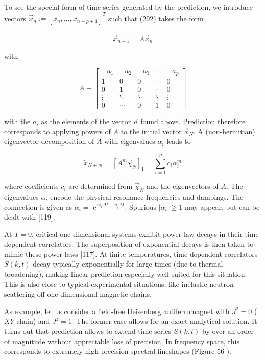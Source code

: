 \documentclass[12pt]{article}
\begin{document}
To see the special form of time-series generated by the prediction, we introduce vectors $\vec{x}_{n}:=\left[x_{n}, \ldots, x_{n-p+1}\right]^{T}$ such that (292) takes the form


\begin{equation*}
\tilde{\vec{x}}_{n+1}=A \vec{x}_{n} \tag{294}
\end{equation*}


with

\[
A \equiv\left[\begin{array}{ccccc}
-a_{1} & -a_{2} & -a_{3} & \cdots & -a_{p}  \tag{295}\\
1 & 0 & 0 & \cdots & 0 \\
0 & 1 & 0 & \cdots & 0 \\
\vdots & \ddots & \ddots & \ddots & \vdots \\
0 & \cdots & 0 & 1 & 0
\end{array}\right]
\]

with the $a_{i}$ as the elements of the vector $\vec{a}$ found above. Prediction therefore corresponds to applying powers of $A$ to the initial vector $\vec{x}_{N}$. A (non-hermitian) eigenvector decomposition of $A$ with eigenvalues $\alpha_{i}$ leads to


\begin{equation*}
\tilde{x}_{N+m}=\left[A^{m} \vec{\chi}_{N}\right]_{1}=\sum_{i=1}^{p} c_{i} \alpha_{i}^{m} \tag{296}
\end{equation*}


where coefficients $c_{i}$ are determined from $\vec{\chi}_{N}$ and the eigenvectors of $A$. The eigenvalues $\alpha_{i}$ encode the physical resonance frequencies and dampings. The connection is given as $\alpha_{i}=$ $\mathrm{e}^{\mathrm{i} \omega_{i} \Delta t-\eta_{i} \Delta t}$. Spurious $\left|\alpha_{i}\right| \geq 1$ may appear, but can be dealt with [119].

At $T=0$, critical one-dimensional systems exhibit power-law decays in their time-dependent correlators. The superposition of exponential decays is then taken to mimic these power-laws [117]. At finite temperatures, time-dependent correlators $S(k, t)$ decay typically exponentially for large times (due to thermal broadening), making linear prediction especially well-suited for this situation. This is also close to typical experimental situations, like inelastic neutron scattering off one-dimensional magnetic chains.

As example, let us consider a field-free Heisenberg antiferromagnet with $J^{2}=0$ ( $X Y$-chain) and $J^{z}=1$. The former case allows for an exact analytical solution. It turns out that prediction allows to extend time series $S(k, t)$ by over an order of magnitude without appreciable loss of precision. In frequency space, this corresponds to extremely high-precision spectral lineshapes (Figure 56 ).
\end{document}

